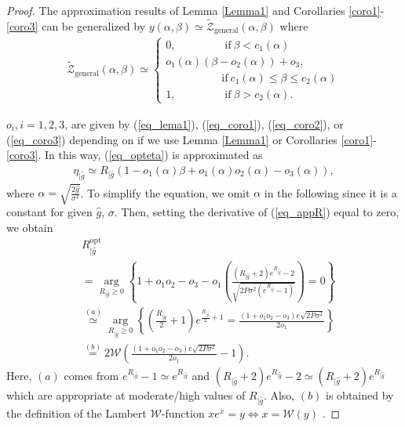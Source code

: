 \begin{proof}
The  approximation results of Lemma \ref{Lemma1} and Corollaries \ref{coro1}-\ref{coro3} can be generalized by $y(\alpha,\beta)\simeq\tilde{\mathcal{Z}}_{\text{general}}(\alpha,\beta)$ where
\begin{align}
\tilde{\mathcal{Z}}_{\text{general}}(\alpha,\beta)\simeq
\begin{cases}
0,~~~~~~~~~~~~~~~~~~~~\mathrm{if}~\beta < c_1(\alpha)  \\ 
o_1(\alpha)(\beta-o_2(\alpha)) + o_3,\\~~~~~~~~~~~~~~~~~~~~~~~\mathrm{if}~ c_1(\alpha) \leq \beta \leq c_2(\alpha)\\ 
1,~~~~~~~~~~~~~~~~~~~~\mathrm{if}~ \beta> c_2(\alpha).
\end{cases}
\end{align}


$o_i,i=1,2,3$, are given by (\ref{eq_lema1}), (\ref{eq_coro1}), (\ref{eq_coro2}), or (\ref{eq_coro3}) depending on if we use Lemma \ref{Lemma1} or Corollaries \ref{coro1}-\ref{coro3}. In this way, (\ref{eq_opteta}) is approximated as
\begin{align}\label{eq_appR}
    \eta_{|\hat {g}}\simeq R_{|\hat{g}}\left(1-o_1(\alpha)\beta + o_1(\alpha)o_2(\alpha) - o_3(\alpha)\right),
\end{align}
where $\alpha = \sqrt{\frac{2\hat{g}}{\sigma^2}}$. To simplify the equation, we omit $\alpha$ in the following since it is a constant for given $\hat{g}$, $\sigma$. Then, setting the derivative of (\ref{eq_appR}) equal to zero, we obtain
\begin{align}\label{eq_appRF}
    & R_{|\hat{g}}^{\text{opt}}  \nonumber\\
    & = \operatorname*{arg}_{R_{|\hat{g}}\geq 0}\left\{ 1+o_1o_2-o_3-o_1\left(\frac{(R_{|\hat{g}}+2)e^{R_{|\hat{g}}}-2}{\sqrt{2P\sigma^2\left(e^{R_{|\hat{g}}}-1\right)}}\right)=0\right\}\nonumber\\
    & \overset{(a)}{\simeq} \operatorname*{arg}_{R_{|\hat{g}}\geq 0}\left\{ \left(\frac{R_{|\hat{g}}}{2}+1\right)e^{\frac{R_{|\hat{g}}}{2}+1} = \frac{(1+o_1o_2-o_3)e\sqrt{2P\sigma^2}}{2o_1}\right\}\nonumber\\
    & \overset{(b)}{=} 2\mathcal{W}\left(\frac{(1+o_1o_2-o_3)e\sqrt{2P\sigma^2}}{2o_1}-1\right).
\end{align}
Here,  $(a)$ comes from $e^{R_{|\hat{g}}}-1 \simeq e^{R_{|\hat{g}}} $ and $(R_{|\hat{g}}+2)e^{R_{|\hat{g}}}-2 \simeq (R_{|\hat{g}}+2)e^{R_{|\hat{g}}} $ which are appropriate at moderate/high values of $R_{|\hat{g}}$. Also, $(b)$ is obtained by the definition of the Lambert $\mathcal{W}$-function $xe^x = y \Leftrightarrow x = \mathcal{W}(y)$ \cite{corless1996lambertw}. 

\end{proof}

